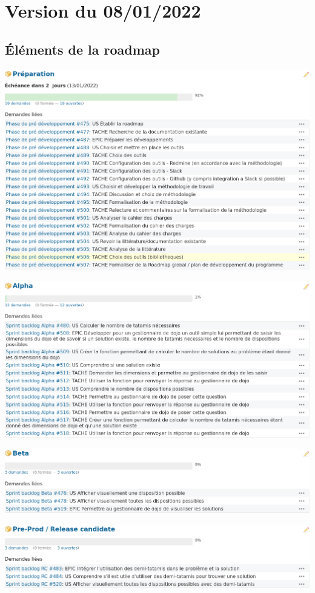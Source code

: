 \section{Version du 08/01/2022}

\subsection{Éléments de la roadmap}
\includegraphics[scale=0.5]{images/prepa.png}

\includegraphics[scale=0.5]{images/roadmap_alpha.png}

\includegraphics[scale=0.5]{images/roadmap_beta.png}

\includegraphics[scale=0.5]{images/roadmap_RC.png}

